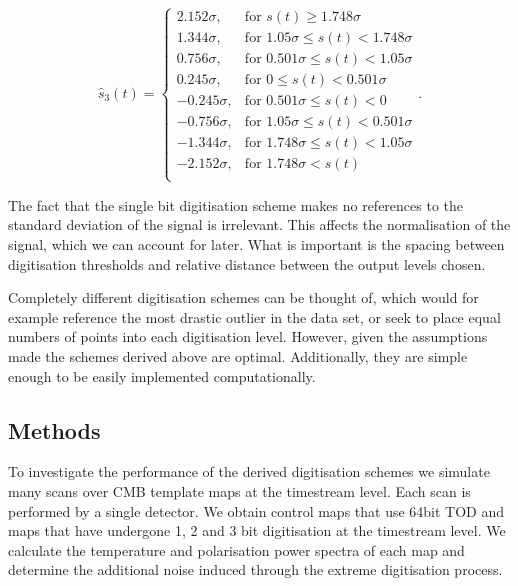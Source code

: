 \documentclass[apj]{emulateapj}
\begin{document}
\begin{equation} \hat{s}_3(t) = \left\{ \begin{array}{rl}
2.152 \sigma, & \text{for } s(t) \geq 1.748 \sigma\\
1.344 \sigma, & \text{for } 1.05 \sigma \leq s(t) < 1.748 \sigma\\
0.756 \sigma, & \text{for } 0.501 \sigma \leq s(t) < 1.05 \sigma\\
0.245 \sigma, & \text{for } 0 \leq s(t) < 0.501 \sigma\\
-0.245 \sigma, & \text{for } 0.501 \sigma \leq s(t) < 0\\
-0.756 \sigma, & \text{for } 1.05 \sigma \leq s(t) < 0.501 \sigma\\
-1.344 \sigma, & \text{for } 1.748 \sigma \leq s(t) < 1.05 \sigma\\
-2.152 \sigma, & \text{for } 1.748 \sigma < s(t)\\
\end{array} \right. . \end{equation}

The fact that the single bit digitisation scheme makes no references to the standard deviation of the signal is irrelevant. This affects the normalisation of the signal, which we can account for later. What is important is the spacing between digitisation thresholds and relative distance between the output levels chosen.

Completely different digitisation schemes can be thought of, which would for example reference the most drastic outlier in the data set, or seek to place equal numbers of points into each digitisation level. However, given the assumptions made the schemes derived above are optimal. Additionally, they are simple enough to be easily implemented computationally.

\subsection{Methods}
\label{subsec:method}

To investigate the performance of the derived digitisation schemes we simulate many scans over CMB template maps at the timestream level. Each scan is performed by a single detector. We obtain control maps that use 64bit TOD and maps that have undergone 1, 2 and 3 bit digitisation at the timestream level. We calculate the temperature and polarisation power spectra of each map and determine the additional noise induced through the extreme digitisation process.
\end{document}
